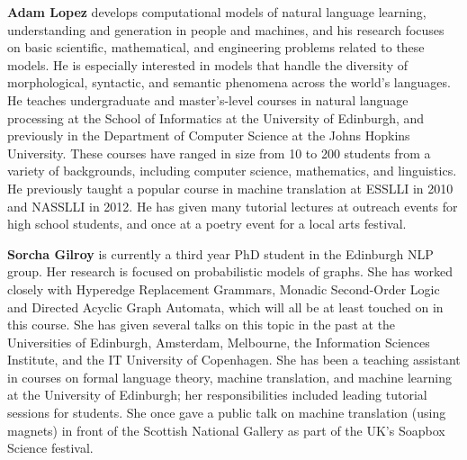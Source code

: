 \begin{bio}

\textbf{Adam Lopez} develops computational models of natural language learning, understanding and generation
in people and machines, and his research focuses on basic scientific, mathematical, and
engineering problems related to these models. He is especially interested in models that handle
the diversity of morphological, syntactic, and semantic phenomena across the world's languages.
He teaches undergraduate and master's-level courses in natural language processing at the School
of Informatics at the University of Edinburgh, and previously in the Department of Computer
Science at the Johns Hopkins University. These courses have ranged in size from 10 to 200 students
from a variety of backgrounds, including computer science, mathematics, and linguistics. He
previously taught a popular course in machine translation at ESSLLI in 2010 and NASSLLI in
2012. He has given many tutorial lectures at outreach events for high school students, and once at
a poetry event for a local arts festival.

\textbf{Sorcha Gilroy} is currently a third year PhD student in the Edinburgh NLP group. Her research is
focused on probabilistic models of graphs. She has worked closely with Hyperedge Replacement
Grammars, Monadic Second-Order Logic and Directed Acyclic Graph Automata, which will all
be at least touched on in this course. She has given several talks on this topic in the past at the
Universities of Edinburgh, Amsterdam, Melbourne, the Information Sciences Institute, and the IT
University of Copenhagen. She has been a teaching assistant in courses on formal language theory,
machine translation, and machine learning at the University of Edinburgh; her responsibilities
included leading tutorial sessions for students. She once gave a public talk on machine translation
(using magnets) in front of the Scottish National Gallery as part of the UK's Soapbox Science
festival.

\end{bio}

